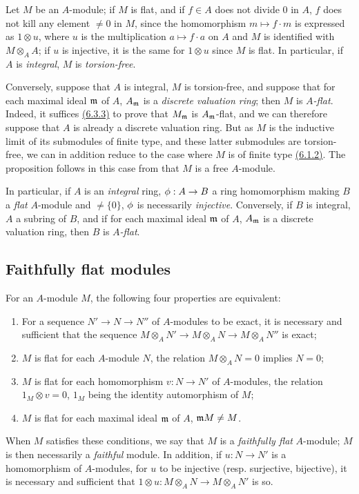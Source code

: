 \begin{env}[6.3.4]
\label{0.6.3.4}
Let $M$ be an $A$-module; if $M$ is flat, and if $f\in A$ does not divide $0$ in $A$, $f$
does not kill any element $\neq 0$ in $M$, since the homomorphism $m\mapsto f\cdot m$ is
expressed as $1\otimes u$, where $u$ is the multiplication $a\mapsto f\cdot a$ on $A$ and
$M$ is identified with $M\otimes_A A$; if $u$ is injective, it is the same for $1\otimes u$
since $M$ is flat. In particular, if $A$ is {\em integral}, $M$ is {\em torsion-free}.

Conversely, suppose that $A$ is integral, $M$ is torsion-free, and suppose that for each
maximal ideal $\mathfrak{m}$ of $A$, $A_\mathfrak{m}$ is a {\em discrete valuation ring};
then $M$ is {\em $A$-flat}. Indeed, it suffices \hyperref[0.6.3.3]{(6.3.3)} to prove that
$M_\mathfrak{m}$ is $A_\mathfrak{m}$-flat, and we can therefore suppose that $A$ is already
a discrete valuation ring. But as $M$ is the inductive limit of its submodules of finite
type, and these latter submodules are torsion-free, we can in addition reduce to the case
where $M$ is of finite type \hyperref[0.6.1.2]{(6.1.2)}. The proposition follows in this
case from that $M$ is a free $A$-module.

In particular, if $A$ is an {\em integral} ring, $\phi:A\to B$ a ring homomorphism making
$B$ a {\em flat} $A$-module and $\neq\{0\}$, $\phi$ is necessarily {\em injective}.
Conversely, if $B$ is integral, $A$ a subring of $B$, and if for each maximal ideal
$\mathfrak{m}$ of $A$, $A_\mathfrak{m}$ is a discrete valuation ring, then $B$ is
{\em $A$-flat}.
\end{env}

\subsection{Faithfully flat modules}
\label{subsection-faithfully-flat-modules}

\begin{env}[6.4.1]
\label{0.6.4.1}
For an $A$-module $M$, the following four properties are equivalent:
\begin{enumerate}[label=(\alph*)]
  \item For a sequence $N'\to N\to N''$ of $A$-modules to be exact, it is necessary and
    sufficient that the sequence $M\otimes_A N'\to M\otimes_A N\to M\otimes_A N''$ is exact;
  \item $M$ is flat for each $A$-module $N$, the relation $M\otimes_A N=0$ implies $N=0$;
  \item $M$ is flat for each homomorphism $v:N\to N'$ of $A$-modules, the relation
    $1_M\otimes v=0$, $1_M$ being the identity automorphism of $M$;
  \item $M$ is flat for each maximal ideal $\mathfrak{m}$ of $A$, $\mathfrak{m}M\neq M$.
\end{enumerate}

When $M$ satisfies these conditions, we say that $M$ is a {\em faithfully flat} $A$-module;
$M$ is then necessarily a {\em faithful} module. In addition, if $u:N\to N'$ is a
homomorphism of $A$-modules, for $u$ to be injective (resp. surjective, bijective), it is
necessary and sufficient that $1\otimes u:M\otimes_A N\to M\otimes_A N'$ is so.
\end{env}

